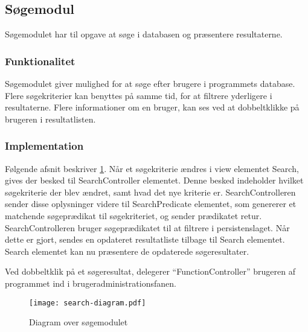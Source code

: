 \subsection{Søgemodul}
\label{sub:s_searchmodul}

Søgemodulet har til opgave at søge i databasen og præsentere resultaterne.

\subsubsection{Funktionalitet}

Søgemodulet giver mulighed for at søge efter brugere i programmets database. Flere søgekriterier kan benyttes på samme tid, for at filtrere yderligere i resultaterne. Flere informationer om en bruger, kan ses ved at dobbeltklikke på brugeren i resultatlisten.

\subsubsection{Implementation}

Følgende afsnit beskriver \cref{fig:soegemodul}. Når et søgekriterie ændres i view elementet Search, gives der besked til SearchController elementet. Denne besked indeholder hvilket søgekriterie der blev ændret, samt hvad det nye kriterie er. SearchControlleren sender disse oplysninger videre til SearchPredicate elementet, som genererer et matchende søgeprædikat til søgekriteriet, og sender prædikatet retur. SearchControlleren bruger søgeprædikatet til at filtrere i persistenslaget. Når dette er gjort, sendes en opdateret resultatliste tilbage til Search elementet. Search elementet kan nu præsentere de opdaterede søgeresultater.

Ved dobbeltklik på et søgeresultat, delegerer \enquote{FunctionController} brugeren af programmet ind i brugeradministrationsfanen.

\begin{figure}
  \centering
  \texttt{[image: search-diagram.pdf]}
  \caption{Diagram over søgemodulet} \label{fig:soegemodul}
\end{figure}


